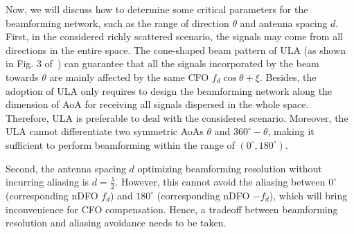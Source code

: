 \documentclass[12pt, draftclsnofoot, onecolumn]{IEEEtran}
\begin{document}
Now, we will discuss how to determine some critical parameters for the beamforming network, such as the range of direction $\theta$ and antenna spacing $d$.
First, in the considered richly scattered scenario, the signals may come from all directions in the entire space. The cone-shaped beam pattern of ULA (as shown in Fig. 3 of~\cite{W_Guo2017TVT}) can guarantee that all the signals incorporated by the beam towards $\theta$ are mainly affected by the same CFO ${{f}_{d}}\cos \theta +\xi $. Besides, the adoption of ULA only requires to design the beamforming network along the dimension of AoA for receiving all signals dispersed in the whole space. Therefore, ULA is preferable to deal with the considered scenario.
Moreover, the ULA cannot differentiate two symmetric AoAs $\theta$ and $360^\circ\!-\!\theta$, making it sufficient to perform beamforming within the range of $(0^\circ,180^\circ)$.

Second, the antenna spacing $d$ optimizing beamforming resolution without incurring aliasing is $d=\frac{\lambda}{2}$. However, this cannot avoid the aliasing between $0^\circ$ (corresponding nDFO $f_d$) and $180^\circ $ (corresponding nDFO $-f_d$), which will bring inconvenience for CFO compensation. Hence, a tradeoff between beamforming resolution and aliasing avoidance needs to be taken.
\end{document}
